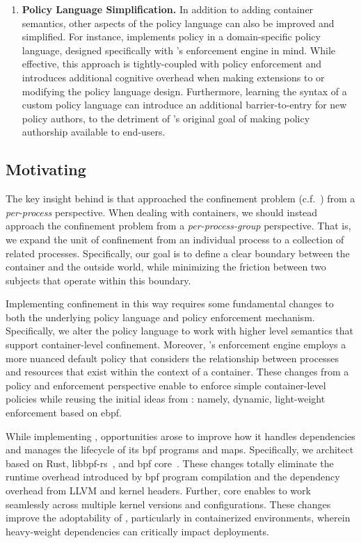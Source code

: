 \begin{enumerate}
  \item \textbf{Policy Language Simplification.}
    In addition to adding container semantics, other aspects of the \bpfbox{} policy
    language can also be improved and simplified. For instance, \bpfbox{} implements
    policy in a domain-specific policy language, designed specifically with \bpfbox{}'s
    enforcement engine in mind. While effective, this approach is tightly-coupled with
    policy enforcement and introduces additional cognitive overhead when making extensions
    to or modifying the policy language design. Furthermore, learning the syntax of
    a custom policy language can introduce an additional barrier-to-entry for new policy
    authors, to the detriment of \bpfbox{}'s original goal of making policy authorship
    available to end-users.
\end{enumerate}

\subsection{Motivating \bpfcontain{}}

The key insight behind \bpfcontain{} is that \bpfbox{} approached the confinement problem
(c.f.~) from a \textit{per-process} perspective. When dealing
with containers, we should instead approach the confinement problem from
a \textit{per-process-group} perspective. That is, we expand the unit of confinement from
an individual process to a collection of related processes. Specifically, our goal is to
define a clear boundary between the container and the outside world, while minimizing the
friction between two subjects that operate within this boundary.

Implementing confinement in this way requires some fundamental changes to both the
underlying policy language and policy enforcement mechanism. Specifically, we alter the
policy language to work with higher level semantics that support container-level
confinement. Moreover, \bpfcontain{}'s enforcement engine employs a more nuanced default
policy that considers the relationship between processes and resources that exist within
the context of a container. These changes from a policy and enforcement perspective enable
\bpfcontain{} to enforce simple container-level policies while reusing the initial ideas
from \bpfbox{}: namely, dynamic, light-weight enforcement based on \gls{ebpf}.

While implementing \bpfcontain{}, opportunities arose to improve how it handles
dependencies and manages the lifecycle of its \gls{bpf} programs and maps. Specifically,
we architect \bpfcontain{} based on Rust, libbpf-rs~\cite{libbpf-rs}, and \gls{bpf}
\gls{core}~\cite{nakryiko2020_core}. These changes totally eliminate the runtime overhead
introduced by \gls{bpf} program compilation and the dependency overhead from LLVM and
kernel headers. Further, \gls{core} enables \bpfcontain{} to work seamlessly across
multiple kernel versions and configurations. These changes improve the adoptability of
\bpfcontain{}, particularly in containerized environments, wherein heavy-weight
dependencies can critically impact deployments.


